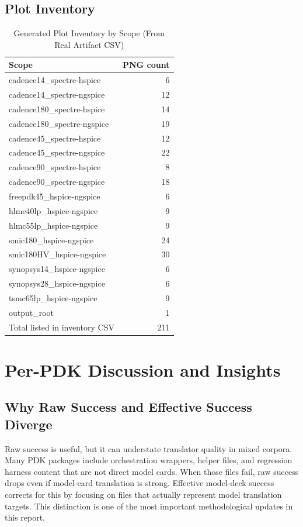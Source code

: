 \documentclass[12pt,a4paper,oneside]{report}
\begin{document}
\section{Plot Inventory}
\begin{table}[H]
\centering
\caption{Generated Plot Inventory by Scope (From Real Artifact CSV)}
\label{tab:plotinv}
\begin{tabular}{lr}
\toprule
Scope & PNG count \\
\midrule
cadence14\_spectre-hspice & 6 \\
cadence14\_spectre-ngspice & 12 \\
cadence180\_spectre-hspice & 14 \\
cadence180\_spectre-ngspice & 19 \\
cadence45\_spectre-hspice & 12 \\
cadence45\_spectre-ngspice & 22 \\
cadence90\_spectre-hspice & 8 \\
cadence90\_spectre-ngspice & 18 \\
freepdk45\_hspice-ngspice & 6 \\
hlmc40lp\_hspice-ngspice & 9 \\
hlmc55lp\_hspice-ngspice & 9 \\
smic180\_hspice-ngspice & 24 \\
smic180HV\_hspice-ngspice & 30 \\
synopsys14\_hspice-ngspice & 6 \\
synopsys28\_hspice-ngspice & 6 \\
tsmc65lp\_hspice-ngspice & 9 \\
output\_root & 1 \\
\midrule
Total listed in inventory CSV & 211 \\
\bottomrule
\end{tabular}
\end{table}

\chapter{Per-PDK Discussion and Insights}

\section{Why Raw Success and Effective Success Diverge}
Raw success is useful, but it can understate translator quality in mixed corpora. Many PDK packages include orchestration wrappers, helper files, and regression harness content that are not direct model cards. When those files fail, raw success drops even if model-card translation is strong. Effective model-deck success corrects for this by focusing on files that actually represent model translation targets. This distinction is one of the most important methodological updates in this report.
\end{document}
